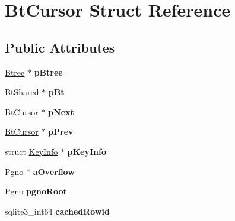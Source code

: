 \hypertarget{struct_bt_cursor}{\section{Bt\-Cursor Struct Reference}
\label{struct_bt_cursor}
}
\subsection*{Public Attributes}
\begin{DoxyCompactItemize}
\item 
\hypertarget{struct_bt_cursor_a2ad810542eaf99c9919c585624bead6f}{\hyperlink{struct_btree}{Btree} $\ast$ {\bfseries p\-Btree}}\label{struct_bt_cursor_a2ad810542eaf99c9919c585624bead6f}

\item 
\hypertarget{struct_bt_cursor_a61c245712549192f7644e5ac23c00b74}{\hyperlink{struct_bt_shared}{Bt\-Shared} $\ast$ {\bfseries p\-Bt}}\label{struct_bt_cursor_a61c245712549192f7644e5ac23c00b74}

\item 
\hypertarget{struct_bt_cursor_ad2f8fe3aa7d3fa3309692b3e8a8c2395}{\hyperlink{struct_bt_cursor}{Bt\-Cursor} $\ast$ {\bfseries p\-Next}}\label{struct_bt_cursor_ad2f8fe3aa7d3fa3309692b3e8a8c2395}

\item 
\hypertarget{struct_bt_cursor_ac4f788ee88f252ddfcef8804674c7c90}{\hyperlink{struct_bt_cursor}{Bt\-Cursor} $\ast$ {\bfseries p\-Prev}}\label{struct_bt_cursor_ac4f788ee88f252ddfcef8804674c7c90}

\item 
\hypertarget{struct_bt_cursor_ad2360bda13f959ed70672eb421fdb5ec}{struct \hyperlink{struct_key_info}{Key\-Info} $\ast$ {\bfseries p\-Key\-Info}}\label{struct_bt_cursor_ad2360bda13f959ed70672eb421fdb5ec}

\item 
\hypertarget{struct_bt_cursor_ae2dbcc15e63d349774a7ad6caef4d096}{Pgno $\ast$ {\bfseries a\-Overflow}}\label{struct_bt_cursor_ae2dbcc15e63d349774a7ad6caef4d096}

\item 
\hypertarget{struct_bt_cursor_a0b038f63a5b1b9df0b892e0773ffdd29}{Pgno {\bfseries pgno\-Root}}\label{struct_bt_cursor_a0b038f63a5b1b9df0b892e0773ffdd29}

\item 
\hypertarget{struct_bt_cursor_ad66b1a006f910aeb12de1e93d9a84cff}{sqlite3\-\_\-int64 {\bfseries cached\-Rowid}}\label{struct_bt_cursor_ad66b1a006f910aeb12de1e93d9a84cff}


\end{DoxyCompactItemize}
